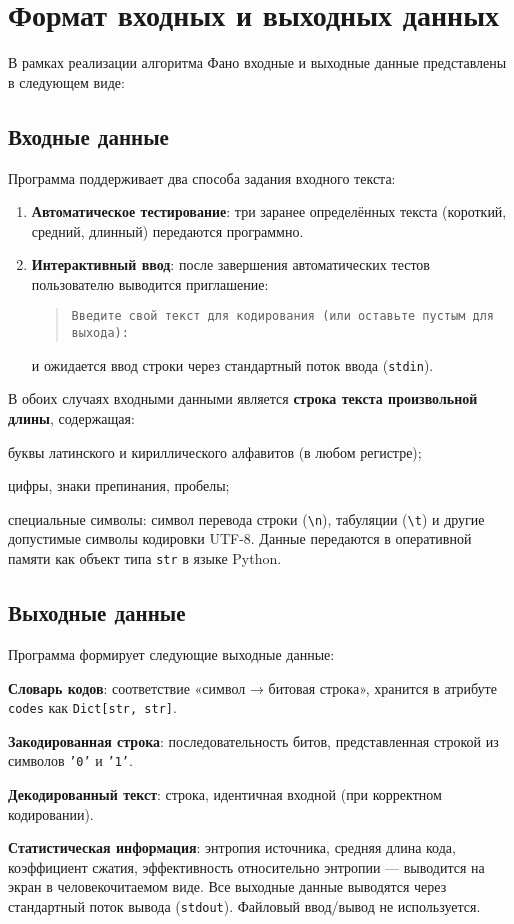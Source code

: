 \documentclass[a4paper,12pt]{article}
\begin{document}
\section{Формат входных и выходных данных}

В рамках реализации алгоритма Фано входные и выходные данные представлены в следующем виде:

\subsection{Входные данные}
Программа поддерживает два способа задания входного текста:
\begin{enumerate}
    \item \textbf{Автоматическое тестирование}: три заранее определённых текста (короткий, средний, длинный) передаются программно.
    \item \textbf{Интерактивный ввод}: после завершения автоматических тестов пользователю выводится приглашение:
    \begin{quote}
        \texttt{Введите свой текст для кодирования (или оставьте пустым для выхода):}
    \end{quote}
    и ожидается ввод строки через стандартный поток ввода (\texttt{stdin}).
\end{enumerate}

В обоих случаях входными данными является \textbf{строка текста произвольной длины}, содержащая:
\item буквы латинского и кириллического алфавитов (в любом регистре);
    \item цифры, знаки препинания, пробелы;
    \item специальные символы: символ перевода строки (\texttt{\textbackslash n}), табуляции (\texttt{\textbackslash t}) и другие допустимые символы кодировки UTF-8.
Данные передаются в оперативной памяти как объект типа \texttt{str} в языке Python.

\subsection{Выходные данные}
Программа формирует следующие выходные данные:
\item \textbf{Словарь кодов}: соответствие «символ → битовая строка», хранится в атрибуте \texttt{codes} как \texttt{Dict[str, str]}.
    \item \textbf{Закодированная строка}: последовательность битов, представленная строкой из символов \texttt{'0'} и \texttt{'1'}.
    \item \textbf{Декодированный текст}: строка, идентичная входной (при корректном кодировании).
    \item \textbf{Статистическая информация}: энтропия источника, средняя длина кода, коэффициент сжатия, эффективность относительно энтропии — выводится на экран в человекочитаемом виде.
Все выходные данные выводятся через стандартный поток вывода (\texttt{stdout}). Файловый ввод/вывод не используется.
\end{document}
